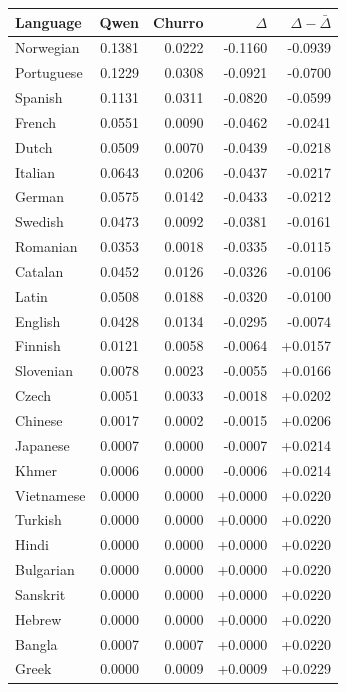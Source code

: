 \documentclass{article}
\begin{document}
\begin{table}[H]
\centering
\small
\begin{tabular}{lrrrr}
\toprule
Language & Qwen & Churro & $\Delta$ & $\Delta - \bar{\Delta}$ \\
\midrule
    Norwegian & 0.1381 & 0.0222 & -0.1160 & -0.0939 \\
    Portuguese & 0.1229 & 0.0308 & -0.0921 & -0.0700 \\
    Spanish & 0.1131 & 0.0311 & -0.0820 & -0.0599 \\
    French & 0.0551 & 0.0090 & -0.0462 & -0.0241 \\
    Dutch & 0.0509 & 0.0070 & -0.0439 & -0.0218 \\
    Italian & 0.0643 & 0.0206 & -0.0437 & -0.0217 \\
    German & 0.0575 & 0.0142 & -0.0433 & -0.0212 \\
    Swedish & 0.0473 & 0.0092 & -0.0381 & -0.0161 \\
    Romanian & 0.0353 & 0.0018 & -0.0335 & -0.0115 \\
    Catalan & 0.0452 & 0.0126 & -0.0326 & -0.0106 \\
    Latin & 0.0508 & 0.0188 & -0.0320 & -0.0100 \\
    English & 0.0428 & 0.0134 & -0.0295 & -0.0074 \\
    Finnish & 0.0121 & 0.0058 & -0.0064 & +0.0157 \\
    Slovenian & 0.0078 & 0.0023 & -0.0055 & +0.0166 \\
    Czech & 0.0051 & 0.0033 & -0.0018 & +0.0202 \\
    Chinese & 0.0017 & 0.0002 & -0.0015 & +0.0206 \\
    Japanese & 0.0007 & 0.0000 & -0.0007 & +0.0214 \\
    Khmer & 0.0006 & 0.0000 & -0.0006 & +0.0214 \\
    Vietnamese & 0.0000 & 0.0000 & +0.0000 & +0.0220 \\
    Turkish & 0.0000 & 0.0000 & +0.0000 & +0.0220 \\
    Hindi & 0.0000 & 0.0000 & +0.0000 & +0.0220 \\
    Bulgarian & 0.0000 & 0.0000 & +0.0000 & +0.0220 \\
    Sanskrit & 0.0000 & 0.0000 & +0.0000 & +0.0220 \\
    Hebrew & 0.0000 & 0.0000 & +0.0000 & +0.0220 \\
    Bangla & 0.0007 & 0.0007 & +0.0000 & +0.0220 \\
    Greek & 0.0000 & 0.0009 & +0.0009 & +0.0229 \\

\end{tabular}
\end{table}
\end{document}
